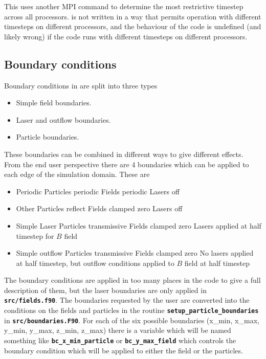 \documentclass[12pt,a4paper]{article}
\newcommand{\inlinecode}[1]{{\color{warwickred} \bf\texttt{#1}}}
\newcommand{\EPOCH}{{\color{warwickdark}\fontfamily{phv}\selectfont{EPOCH}}}
\begin{document}
This uses another MPI command to determine the most restrictive timestep across
all processors. {\EPOCH} is not written in a way that permits operation with
different timesteps on different processors, and the behaviour of the code is
undefined (and likely wrong) if the code runs with different timesteps on
different processors.

\subsection{Boundary conditions}
\label{sec:bcs}
Boundary conditions in {\EPOCH} are split into three types
\begin{itemize}
\item Simple field boundaries.
\item Laser and outflow boundaries.
\item Particle boundaries.
\end{itemize}

These boundaries can be combined in different ways to give different
effects. From the end user perspective there are 4 boundaries which can be
applied to each edge of the simulation domain. These are
\begin{itemize}
\item Periodic
  \subitem Particles periodic
  \subitem Fields periodic
  \subitem Lasers off
\item Other
  \subitem Particles reflect
  \subitem Fields clamped zero
  \subitem Lasers off
\item Simple Laser
  \subitem Particles transmissive
  \subitem Fields clamped zero
  \subitem Lasers applied at half timestep for $B$ field
\item Simple outflow
  \subitem Particles transmissive
  \subitem Fields clamped zero
  \subitem No lasers applied at half timestep, but outflow conditions applied
  to $B$ field at half timestep
\end{itemize}
The boundary conditions are applied in too many places in the code to give a
full description of them, but the laser boundaries are only applied in
\inlinecode{src/fields.f90}. The boundaries requested by the user are converted
into the conditions on the fields and particles in the routine
\inlinecode{setup\_particle\_boundaries} in
\inlinecode{src/boundaries.F90}. For each of the six possible boundaries
(x\_min, x\_max, y\_min, y\_max, z\_min, z\_max) there is a variable which will
be named something like \inlinecode{bc\_x\_min\_particle} or
\inlinecode{bc\_y\_max\_field} which controls the boundary condition which will
be applied to either the field or the particles.
\end{document}
